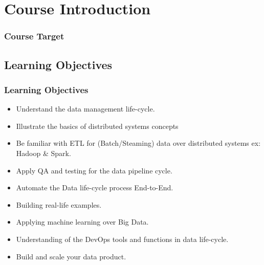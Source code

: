 \section{Course Introduction}


\begin{frame}
\frametitle{Course Target}
\begin{center}			

\end{center}
\end{frame}

\subsection{Learning Objectives}
\begin{frame}
\frametitle{Learning Objectives}

\begin{itemize}
    \item<1-> Understand the data management life-cycle. \pause
    \item<2-> Illustrate the basics of distributed systems concepts \pause
    \item<3-> Be familiar with ETL for (Batch/Steaming) data over distributed systems ex: Hadoop \& Spark.  \pause
    \item<4-> Apply QA and testing for the data pipeline cycle.
    \item<5-> Automate the Data life-cycle process End-to-End. \pause
    \item<6-> Building real-life examples. \pause
    \item<7-> Applying machine learning over Big Data. \pause
    \item<8-> Understanding of the DevOps tools and functions in data life-cycle. \pause
    \item<9-> Build and scale your data product. \pause
\end{itemize}

\end{frame}

